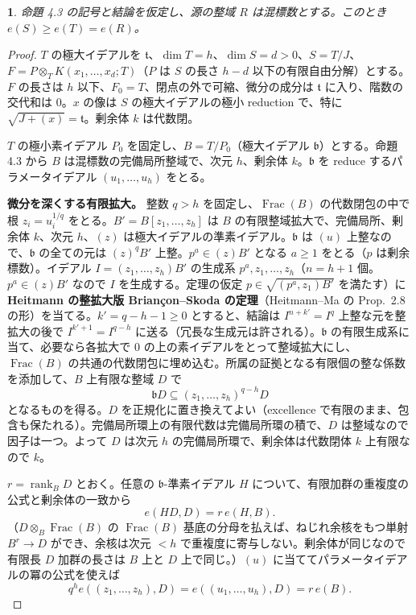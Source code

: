 \documentclass[11pt,a4paper]{ltjsarticle}
\newcommand{\stmtname}{}
\theoremstyle{plain}
\newtheorem*{stmtgen}{\stmtname}
\newenvironment{stmt}[1]{\renewcommand{\stmtname}{#1}\begin{stmtgen}}{\end{stmtgen}}
\theoremstyle{definition}
\newcommand{\tf}{\mathfrak{t}}
\newcommand{\bb}{\mathfrak{b}}
\newcommand{\rank}{\operatorname{rank}}
\newcommand{\Frac}{\operatorname{Frac}}
\begin{document}
\begin{stmt}{定理 6.3}
命題 4.3 の記号と結論を仮定し、源の整域 $R$ は混標数とする。このとき $e(S)\ge e(T) = e(R)$。
\end{stmt}
\begin{proof}
$T$ の極大イデアルを $\tf$、$\dim T = h$、$\dim S = d>0$、$S = T/J$、$F = P\otimes_TK(x_1,\dots,x_d;T)$（$P$ は $S$ の長さ $h-d$ 以下の有限自由分解）とする。$F$ の長さは $h$ 以下、$F_0 = T$、閉点の外で可縮、微分の成分は $\tf$ に入り、階数の交代和は $0$。$x$ の像は $S$ の極大イデアルの極小 reduction で、特に $\sqrt{J+(x)} = \tf$。剰余体 $k$ は代数閉。

$T$ の極小素イデアル $P_0$ を固定し、$B = T/P_0$（極大イデアル $\bb$）とする。命題 4.3 から $B$ は混標数の完備局所整域で、次元 $h$、剰余体 $k$。$\bb$ を reduce するパラメータイデアル $(u_1,\dots,u_h)$ をとる。

\textbf{微分を深くする有限拡大。} 整数 $q>h$ を固定し、$\Frac(B)$ の代数閉包の中で根 $z_i = u_i^{1/q}$ をとる。$B' = B[z_1,\dots,z_h]$ は $B$ の有限整域拡大で、完備局所、剰余体 $k$、次元 $h$、$(z)$ は極大イデアルの準素イデアル。$\bb$ は $(u)$ 上整なので、$\bb$ の全ての元は $(z)^qB'$ 上整。$p^a\in(z)B'$ となる $a\ge1$ をとる（$p$ は剰余標数）。イデアル $I = (z_1,\dots,z_h)B'$ の生成系 $p^a,z_1,\dots,z_h$（$n = h+1$ 個。$p^a\in(z)B'$ なので $I$ を生成する。定理の仮定 $p\in\sqrt{(p^a,z_1)B'}$ を満たす）に \textbf{Heitmann の整拡大版 Briançon--Skoda の定理}（Heitmann--Ma の Prop.~2.8 の形）を当てる。$k' = q-h-1\ge0$ とすると、結論は $I^{n+k'} = I^q$ 上整な元を整拡大の後で $I^{k'+1} = I^{q-h}$ に送る（冗長な生成元は許される）。$\bb$ の有限生成系に当て、必要なら各拡大で $0$ の上の素イデアルをとって整域拡大にし、$\Frac(B)$ の共通の代数閉包に埋め込む。所属の証拠となる有限個の整な係数を添加して、$B$ 上有限な整域 $D$ で
\begin{equation}\tag{6.4}
  \bb D\subseteq(z_1,\dots,z_h)^{q-h}D
\end{equation}
となるものを得る。$D$ を正規化に置き換えてよい（excellence で有限のまま、包含も保たれる）。完備局所環上の有限代数は完備局所環の積で、$D$ は整域なので因子は一つ。よって $D$ は次元 $h$ の完備局所環で、剰余体は代数閉体 $k$ 上有限なので $k$。

$r = \rank_BD$ とおく。任意の $\bb$-準素イデアル $H$ について、有限加群の重複度の公式と剰余体の一致から
\begin{equation}\tag{6.5}
  e(HD,D) = r\,e(H,B).
\end{equation}
（$D\otimes_B\Frac(B)$ の $\Frac(B)$ 基底の分母を払えば、ねじれ余核をもつ単射 $B^r\to D$ ができ、余核は次元 $<h$ で重複度に寄与しない。剰余体が同じなので有限長 $D$ 加群の長さは $B$ 上と $D$ 上で同じ。）$(u)$ に当ててパラメータイデアルの冪の公式を使えば
\begin{equation}\tag{6.6}
  q^he((z_1,\dots,z_h),D) = e((u_1,\dots,u_h),D) = r\,e(B).
\end{equation}


\end{proof}
\end{document}
